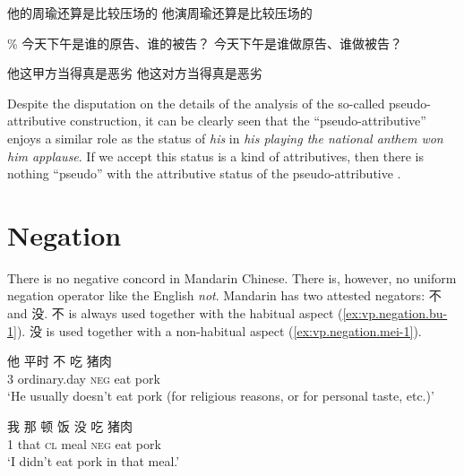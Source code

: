 \documentclass[UTF8, a4paper, oneside, scheme=plain, 12pt]{ctexrep}
\newcommand*{\citepage}[1]{p.~{#1}}
\newcommand{\form}[1]{\emph{#1}}
\newcommand{\translate}[1]{`#1'}
\newcommand*{\category}[1]{\textsc{#1}}
\begin{document}
\begin{exe}
    \ex\label{ex:verb-phrase.vp-argument.subject-semantic.1} 
    \begin{xlist}
        \ex 他的周瑜还算是比较压场的
        \ex 他演周瑜还算是比较压场的
    \end{xlist}
    \ex\label{ex:verb-phrase.vp-argument.subject-semantic.2} 
    \begin{xlist}
        \ex \% 今天下午是谁的原告、谁的被告？
        \ex 今天下午是谁做原告、谁做被告？
    \end{xlist}
    \ex\label{ex:verb-phrase.vp-argument.subject-semantic.3} \begin{xlist}
        \ex 他这甲方当得真是恶劣 
        \ex *他这对方当得真是恶劣
    \end{xlist} 
\end{exe}

Despite the disputation on the details of the analysis 
of the so-called pseudo-attributive construction,
it can be clearly seen that 
the ``pseudo-attributive'' enjoys a similar role 
as the status of \form{his} in \form{his playing the national anthem won him applause}.
If we accept this status is a kind of attributives, 
then there is nothing ``pseudo''
with the attributive status of the pseudo-attributive
\citep[\citepage{242}]{deng2010formal}.

\section{Negation}
 
There is no negative concord in Mandarin Chinese.
There is, however, no uniform negation operator like the English \emph{not}. 
Mandarin has two attested negators: 不 and 没.
不 is always used together with the habitual aspect
(\ref{ex:vp.negation.bu-1}).
没 is used together with a non-habitual aspect
(\ref{ex:vp.negation.mei-1}).

\begin{exe}
    \ex\label{ex:vp.negation.bu-1} \gll 他 平时 不 吃 猪肉 \\ 
    3 ordinary.day \category{neg} eat pork \\ 
    \glt \translate{He usually doesn't eat pork (for religious reasons, or for personal taste, etc.)}

    \ex\label{ex:vp.negation.mei-1} \gll 我 那 顿 饭 没 吃 猪肉 \\
    1 that \category{cl} meal \category{neg} eat pork \\ 
    \glt \translate{I didn't eat pork in that meal.}
\end{exe}
\end{document}
